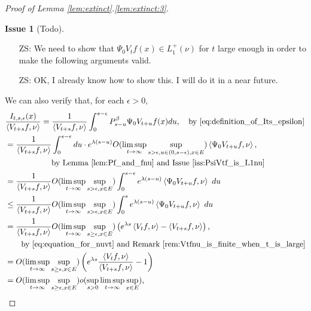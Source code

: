 \documentclass[12pt,a4paper]{amsart}
\numberwithin{equation}{section}
\theoremstyle{plain}
\theoremstyle{definition}
\newtheorem{iss}{Issue}
\begin{document}
\begin{proof}[Proof of Lemma \ref{lem:extinct}.\eqref{lem:extinct:3}]
\begin{iss}[Todo]~
\label{iss:PsiVtf_is_L1nu}
  \begin{itemize}
  \item[ZS:]
We need to show that $\Psi_0 V_tf(x) \in L_1^+(\nu)$ for $t$ large enough in order to make the following arguments valid.
\item[ZS:]
OK, I already know how to show this. I will do it in a near future. 
  \end{itemize}
\end{iss}
We can also verify that, for each $\epsilon > 0$,
\begin{align}
&\frac{I_{t,s,\epsilon}(x)}{\left\langle V_{t+s}f,\nu \right\rangle} 
= \frac{1}{\left\langle V_{t+s}f,\nu \right\rangle }  \int_0^{s-\epsilon} P_{s-u}^\beta \Psi_0 V_{t+u}f(x) du,\quad\text{by~\eqref{eq:definition_of_Its_epsilon}} 
\\& \begin{multlined}
= \frac{1}{\left\langle V_{t+s}f,\nu \right\rangle}  \int_0^{s-\epsilon} du \cdot e^{\lambda (s- u)} O(\limsup_{t\to \infty}\sup_{s > \epsilon, u\in (0, s-\epsilon), x\in E}) \left\langle \Psi_0 V_{t+u}f,\nu \right\rangle ,
\\\quad\text{by~Lemma \ref{lem:Pf_and_fnu} and Issue \ref{iss:PsiVtf_is_L1nu}} 
\end{multlined}
\\& = \frac{1}{\left\langle V_{t+s}f,\nu \right\rangle} O(\limsup_{t\to \infty}\sup_{s > \epsilon, x\in E}) \int_0^{s-\epsilon} e^{\lambda (s- u)}  \left\langle \Psi_0 V_{t+u}f,\nu \right\rangle ~du
\\& \leq \frac{1}{\left\langle V_{t+s}f,\nu \right\rangle} O(\limsup_{t\to \infty}\sup_{s > \epsilon, x\in E}) \int_0^{s} e^{\lambda (s- u)}  \left\langle \Psi_0 V_{t+u}f,\nu \right\rangle ~ du 
\\& \begin{multlined}
= \frac{1}{\left\langle V_{t+s}f,\nu \right\rangle} O(\limsup_{t\to \infty}\sup_{s\geq \epsilon, x\in E}) \left( e^{\lambda s} \left\langle V_tf,\nu \right\rangle - \left\langle V_{t+s}f,\nu \right\rangle \right),\\\quad\text{by~\eqref{eq:equation_for_nuvt} and Remark \ref{rem:Vtfnu_is_finite_when_t_is_large}}
\end{multlined}
\\& =O(\limsup_{t\to \infty}\sup_{s\geq \epsilon, x\in E}) \left( e^{\lambda s}\frac{ \left\langle V_tf,\nu \right\rangle }{\left \langle V_{t+s}f,\nu \right\rangle}- 1 \right) 
  \\& = O(\limsup_{t\to \infty}\sup_{s\geq \epsilon,x\in E}) o(\sup_{s>0}\limsup_{t\to \infty} \sup_{x\in E}),

\end{align}
\end{proof}
\end{document}
